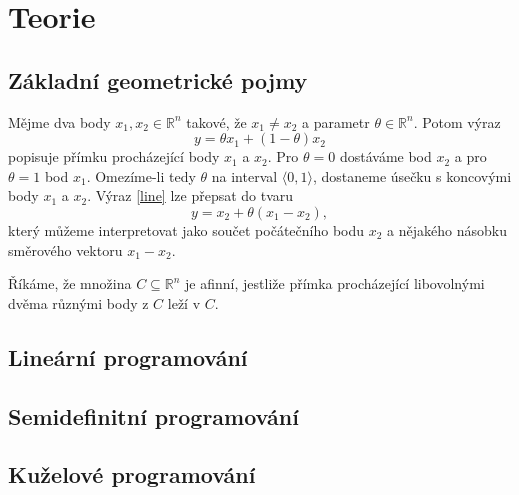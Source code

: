 \part{Teorie}

\chapter{Základní geometrické pojmy}

Mějme dva body $x_1, x_2 \in \mathbb{R}^n$ takové, že $x_1 \neq x_2$ a parametr $\theta \in \mathbb{R}^n$. Potom výraz
\begin{equation}
    y = \theta x_1 + (1 - \theta) x_2
    \label{line}
\end{equation}
popisuje přímku procházející body $x_1$ a $x_2$. Pro $\theta = 0$ dostáváme bod $x_2$ a pro $\theta = 1$ bod $x_1$. Omezíme-li tedy $\theta$ na interval $\langle 0, 1 \rangle$, dostaneme úsečku s koncovými body $x_1$ a $x_2$. Výraz \ref{line} lze přepsat do tvaru
\begin{equation}
    y = x_2 + \theta (x_1 - x_2),
\end{equation}
který můžeme interpretovat jako součet počátečního bodu $x_2$ a nějakého násobku směrového vektoru $x_1 - x_2$.

Říkáme, že množina $C \subseteq \mathbb{R}^n$ je afinní, jestliže přímka procházející libovolnými dvěma různými body z $C$ leží v $C$.



\chapter{Lineární programování}

\chapter{Semidefinitní programování}

\chapter{Kuželové programování}
